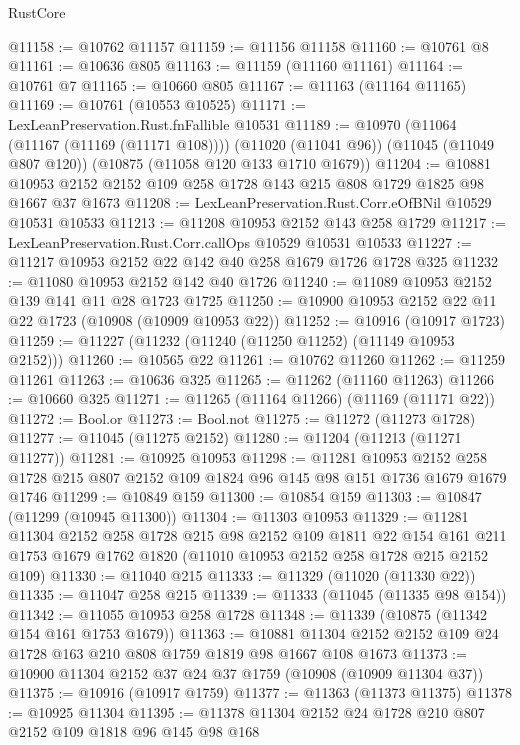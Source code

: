 \begin{lexlean}{RustCore}
\begin{coremodule}
@11158 := @10762 @11157
@11159 := @11156 @11158
@11160 := @10761 @8
@11161 := @10636 @805
@11163 := @11159 (@11160 @11161)
@11164 := @10761 @7
@11165 := @10660 @805
@11167 := @11163 (@11164 @11165)
@11169 := @10761 (@10553 @10525)
@11171 := LexLeanPreservation.Rust.fnFallible @10531
@11189 := @10970
    (@11064 (@11167 (@11169 (@11171 @108))))
    (@11020 (@11041 @96))
    (@11045 (@11049 @807 @120))
    (@10875 (@11058 @120 @133 @1710 @1679))
@11204 := @10881 @10953 @2152 @2152 @109 @258 @1728 @143 @215 @808 @1729 @1825 @98 @1667 @37 @1673
@11208 := LexLeanPreservation.Rust.Corr.eOfBNil @10529 @10531 @10533
@11213 := @11208 @10953 @2152 @143 @258 @1729
@11217 := LexLeanPreservation.Rust.Corr.callOps @10529 @10531 @10533
@11227 := @11217 @10953 @2152 @22 @142 @40 @258 @1679 @1726 @1728 @325
@11232 := @11080 @10953 @2152 @142 @40 @1726
@11240 := @11089 @10953 @2152 @139 @141 @11 @28 @1723 @1725
@11250 := @10900 @10953 @2152 @22 @11 @22 @1723 (@10908 (@10909 @10953 @22))
@11252 := @10916 (@10917 @1723)
@11259 := @11227 (@11232 (@11240 (@11250 @11252) (@11149 @10953 @2152)))
@11260 := @10565 @22
@11261 := @10762 @11260
@11262 := @11259 @11261
@11263 := @10636 @325
@11265 := @11262 (@11160 @11263)
@11266 := @10660 @325
@11271 := @11265 (@11164 @11266) (@11169 (@11171 @22))
@11272 := Bool.or
@11273 := Bool.not
@11275 := @11272 (@11273 @1728)
@11277 := @11045 (@11275 @2152)
@11280 := @11204 (@11213 (@11271 @11277))
@11281 := @10925 @10953
@11298 := @11281
    @10953
    @2152
    @258
    @1728
    @215
    @807
    @2152
    @109
    @1824
    @96
    @145
    @98
    @151
    @1736
    @1679
    @1679
    @1746
@11299 := @10849 @159
@11300 := @10854 @159
@11303 := @10847 (@11299 (@10945 @11300))
@11304 := @11303 @10953
@11329 := @11281
    @11304
    @2152
    @258
    @1728
    @215
    @98
    @2152
    @109
    @1811
    @22
    @154
    @161
    @211
    @1753
    @1679
    @1762
    @1820
    (@11010 @10953 @2152 @258 @1728 @215 @2152 @109)
@11330 := @11040 @215
@11333 := @11329 (@11020 (@11330 @22))
@11335 := @11047 @258 @215
@11339 := @11333 (@11045 (@11335 @98 @154))
@11342 := @11055 @10953 @258 @1728
@11348 := @11339 (@10875 (@11342 @154 @161 @1753 @1679))
@11363 := @10881 @11304 @2152 @2152 @109 @24 @1728 @163 @210 @808 @1759 @1819 @98 @1667 @108 @1673
@11373 := @10900 @11304 @2152 @37 @24 @37 @1759 (@10908 (@10909 @11304 @37))
@11375 := @10916 (@10917 @1759)
@11377 := @11363 (@11373 @11375)
@11378 := @10925 @11304
@11395 := @11378
    @11304
    @2152
    @24
    @1728
    @210
    @807
    @2152
    @109
    @1818
    @96
    @145
    @98
    @168

\end{coremodule}
\end{lexlean}
